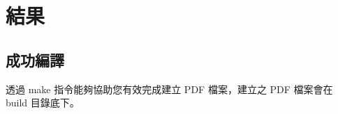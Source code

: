 \chapter{結果}\label{result}

\section{成功編譯}
透過 make 指令能夠協助您有效完成建立 PDF 檔案，建立之 PDF 檔案會在 build 目錄底下。

\clearpage

